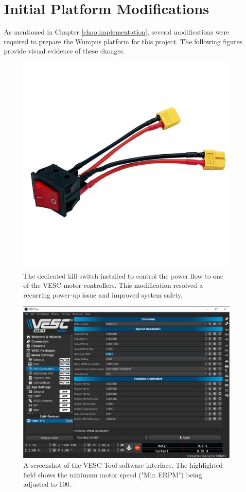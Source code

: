 \cleardoublepage %

\section{Initial Platform Modifications}
\label{sec:appendix_platform_mods}
As mentioned in Chapter \ref{chap:implementation}, several modifications were required to prepare the Wumpus platform for this project. The following figures provide visual evidence of these changes.

\begin{figure}[h!]
    \centering
    \includegraphics[width=0.4\linewidth]{figures/killswitch.PNG}
    \caption{The dedicated kill switch installed to control the power flow to one of the VESC motor controllers. This modification resolved a recurring power-up issue and improved system safety.}
    \label{fig:appendix_killswitch}
\end{figure}

\begin{figure}[h!]
    \centering
    \includegraphics[width=0.8\linewidth]{figures/vesctool.PNG}
    \caption{A screenshot of the VESC Tool software interface. The highlighted field shows the minimum motor speed ("Min ERPM") being adjusted to 100.}
    \label{fig:appendix_vesc_tool}
\end{figure}

